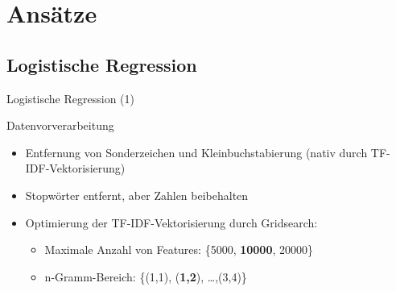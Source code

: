 \documentclass[aspectratio=169]{beamer} %
\begin{document}
\section{Ans\"atze}

\subsection{Logistische Regression}

\begin{frame}{Logistische Regression (1)}
    \begin{block}{Datenvorverarbeitung}
        \begin{itemize}
            \item Entfernung von Sonderzeichen und Kleinbuchstabierung (nativ durch TF-IDF-Vektorisierung)
            \item Stopw\"orter entfernt, aber Zahlen beibehalten
            \item Optimierung der TF-IDF-Vektorisierung durch Gridsearch:
                  \begin{itemize}
                      \item Maximale Anzahl von Features: \{5000, \textbf{10000}, 20000\}
                      \item n-Gramm-Bereich: \{(1,1), (\textbf{1,2}), \dots ,(3,4)\}
                  \end{itemize}
        \end{itemize}
    \end{block}
\end{frame}
\end{document}
